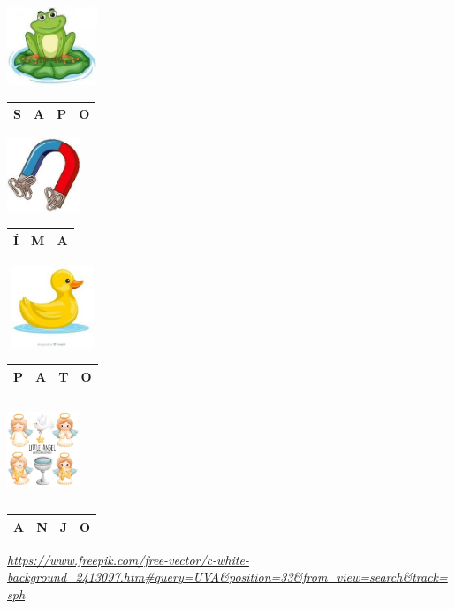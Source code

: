 \includegraphics[width=1.06463in,height=0.91667in]{media/image39.jpg}

\begin{longtable}[]{@{}llll@{}}
\toprule
S & A & P & O\tabularnewline
\bottomrule
\end{longtable}

\includegraphics[width=0.86458in,height=0.86667in]{media/image40.jpg}

\begin{longtable}[]{@{}lll@{}}
\toprule
Í & M & A\tabularnewline
\bottomrule
\end{longtable}

\includegraphics[width=1.07292in,height=0.97005in]{media/image41.jpg}

\begin{longtable}[]{@{}llll@{}}
\toprule
P & A & T & O\tabularnewline
\bottomrule
\end{longtable}

\includegraphics[width=0.85417in,height=1.14167in]{media/image42.jpg}

\begin{longtable}[]{@{}llll@{}}
\toprule
A & N & J & O\tabularnewline
\bottomrule
\end{longtable}

\href{https://www.freepik.com/free-vector/c-white-background_2413097.htm\#query=UVA\&position=33\&from_view=search\&track=sph}{\emph{https://www.freepik.com/free-vector/c-white-background\_2413097.htm\#query=UVA\&position=33\&from\_view=search\&track=sph}}

